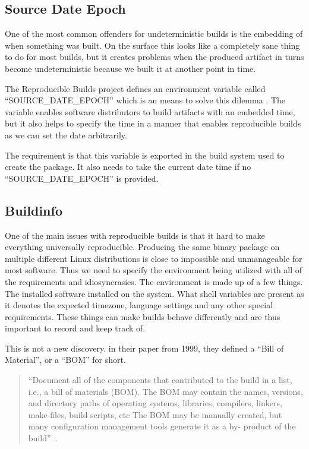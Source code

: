 \documentclass[../Main/thesis.tex]{subfiles}
\begin{document}
\subsection*{Source Date Epoch}
One of the most common offenders for undeterministic builds is the embedding of
when something was built. On the surface this looks like a completely sane thing
to do for most builds, but it creates problems when the produced artifact in
turns become undeterministic because we built it at another point in time.

The Reproducible Builds project defines an environment variable called
``SOURCE\_DATE\_EPOCH'' which is an means to solve this dilemma
\cite{reproducible-builds-2019-source-date-epoch}. The variable enables software
distributors to build artifacts with an embedded time, but it also helps to
specify the time in a manner that enables reproducible builds as we can set the
date arbitrarily.

The requirement is that this variable is exported in the build system used to
create the package. It also needs to take the current date time if no
``SOURCE\_DATE\_EPOCH'' is provided.

\subsection*{Buildinfo}
One of the main issues with reproducible builds is that it hard to make
everything universally reproducible. Producing the same binary package on
multiple different Linux distributions is close to impossible and unmanageable
for most software. Thus we need to specify the environment being utilized with
all of the requirements and idiosyncrasies. The environment is made up of a few
things. The installed software installed on the system. What shell variables are
present as it denotes the expected timezone, language settings and any other
special requirements. These things can make builds behave differently and are
thus important to record and keep track of.

This is not a new discovery. \citeauthor{software-reconstruction-1999} in their
paper  from 1999, they defined a ``Bill
of Material'', or a ``BOM'' for short.

\begin{quotation}
``Document all of the components that contributed to the build in a list, i.e.,
a bill of materials (BOM). The BOM may contain the names, versions, and
directory paths of operating systems, libraries, compilers, linkers, make-files,
build scripts, etc The BOM may be manually created, but many configuration
management tools generate it as a by- product of the build''~\cite{software-reconstruction-1999}.
\end{quotation}
\end{document}
